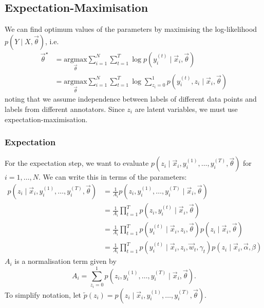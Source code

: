   \subsection{Expectation-Maximisation}

      We can find optimum values of the parameters by maximising the log-likelihood $p(Y \mid X, \vec \theta)$, i.e.
      \begin{align*}
          \vec \theta^\star &= \underset{\vec \theta}{\mbox{argmax}} \sum_{i = 1}^N \sum_{t = 1}^T \log p(y_i^{(t)} \mid \vec x_i, \vec \theta)\\
              &= \underset{\vec \theta}{\mbox{argmax}} \sum_{i = 1}^N \sum_{t = 1}^T \log \sum_{z_i = 0}^1 p(y_i^{(t)}, z_i \mid \vec x_i, \vec \theta)
      \end{align*}
      noting that we assume independence between labels of different data points and labels from different annotators. Since $z_i$ are latent variables, we must use expectation-maximisation.\\

      \subsubsection{Expectation}

        For the expectation step, we want to evaluate $p(z_i \mid \vec x_i, y_i^{(1)}, \dots, y_i^{(T)}, \vec \theta)$ for $i = 1, \dots, N$. We can write this in terms of the parameters:
        \begin{align*}
            p(z_i \mid \vec x_i, y_i^{(1)}, \dots, y_i^{(T)}, \vec \theta) &= \frac{1}{A_i} p(z_i, y_i^{(1)}, \dots, y_i^{(T)} \mid \vec x_i, \vec \theta)\\
                &= \frac{1}{A_i} \prod_{t = 1}^T p(z_i, y_i^{(t)} \mid \vec x_i, \vec \theta)\\
                &= \frac{1}{A_i} \prod_{t = 1}^T p(y_i^{(t)} \mid \vec x_i, z_i, \vec \theta) p(z_i \mid \vec x_i, \vec \theta)\\
                &= \frac{1}{A_i} \prod_{t = 1}^T p(y_i^{(t)} \mid \vec x_i, z_i, \vec w_t, \gamma_t) p(z_i \mid \vec x_i, \vec \alpha, \beta)
        \end{align*}
        $A_i$ is a normalisation term given by
        \[
            A_i = \sum_{z_i = 0}^1 p(z_i, y_i^{(1)}, \dots, y_i^{(T)} \mid \vec x_i, \vec \theta).
        \]
        To simplify notation, let $\tilde p(z_i) = p(z_i \mid \vec x_i, y_i^{(1)}, \dots, y_i^{(T)}, \vec \theta)$.

